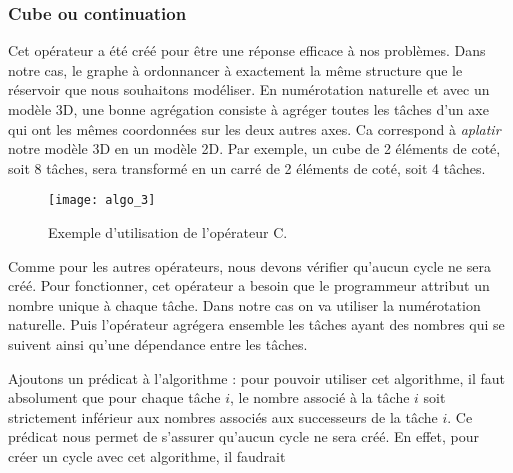 \subsubsection{Cube ou continuation}
Cet opérateur a été créé pour être une réponse efficace à nos problèmes.
%
Dans notre cas, le graphe à ordonnancer à exactement la même structure que le réservoir que nous souhaitons modéliser.
%
En numérotation naturelle et avec un modèle 3D, une bonne agrégation consiste à agréger toutes les tâches d'un axe qui ont les mêmes coordonnées sur les deux autres axes.
%
Ca correspond à {\em aplatir} notre modèle 3D en un modèle 2D.
%
Par exemple, un cube de 2 éléments de coté, soit 8 tâches, sera transformé en un carré de 2 éléments de coté, soit 4 tâches.

\begin{figure}[t!]
  \centering
  \texttt{[image: algo\_3]}
  \caption{Exemple d'utilisation de l'opérateur C.}
  \label{fig:algo_C}
\end{figure}

Comme pour les autres opérateurs, nous devons vérifier qu'aucun cycle ne sera créé.
%
Pour fonctionner, cet opérateur a besoin que le programmeur attribut un nombre unique à chaque tâche.
%
Dans notre cas on va utiliser la numérotation naturelle.
%
Puis l'opérateur agrégera ensemble les tâches ayant des nombres qui se suivent ainsi qu'une dépendance entre les tâches.

Ajoutons un prédicat à l'algorithme : pour pouvoir utiliser cet algorithme, il faut absolument que pour chaque tâche $i$, le nombre associé à la tâche $i$ soit strictement inférieur aux nombres associés aux successeurs de la tâche $i$.
%
Ce prédicat nous permet de s'assurer qu'aucun cycle ne sera créé.
%
En effet, pour créer un cycle avec cet algorithme, il faudrait
